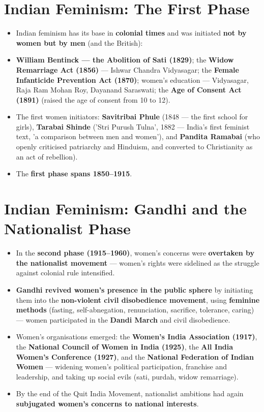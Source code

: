 \section{Indian Feminism: The First Phase}

\begin{KeyConcept}
\begin{itemize}
\item Indian feminism has its base in \textbf{colonial times} and was initiated \textbf{not by women but by men} (and the British):
\item \textbf{William Bentinck --- the Abolition of Sati (1829)}; the \textbf{Widow Remarriage Act (1856)} --- Ishwar Chandra Vidyasagar; the \textbf{Female Infanticide Prevention Act (1870)}; women's education --- Vidyasagar, Raja Ram Mohan Roy, Dayanand Saraswati; the \textbf{Age of Consent Act (1891)} (raised the age of consent from 10 to 12).
\item The first women initiators: \textbf{Savitribai Phule} (1848 --- the first school for girls), \textbf{Tarabai Shinde} ('Stri Purush Tulna', 1882 --- India's first feminist text, 'a comparison between men and women'), and \textbf{Pandita Ramabai} (who openly criticised patriarchy and Hinduism, and converted to Christianity as an act of rebellion).
\item The \textbf{first phase spans 1850--1915}.
\end{itemize}
\end{KeyConcept}

\section{Indian Feminism: Gandhi and the Nationalist Phase}

\begin{KeyConcept}
\begin{itemize}
\item In the \textbf{second phase (1915--1960)}, women's concerns were \textbf{overtaken by the nationalist movement} --- women's rights were sidelined as the struggle against colonial rule intensified.
\item \textbf{Gandhi revived women's presence in the public sphere} by initiating them into the \textbf{non-violent civil disobedience movement}, using \textbf{feminine methods} (fasting, self-abnegation, renunciation, sacrifice, tolerance, caring) --- women participated in the \textbf{Dandi March} and civil disobedience.
\item Women's organisations emerged: the \textbf{Women's India Association (1917)}, the \textbf{National Council of Women in India (1925)}, the \textbf{All India Women's Conference (1927)}, and the \textbf{National Federation of Indian Women} --- widening women's political participation, franchise and leadership, and taking up social evils (sati, purdah, widow remarriage).
\item By the end of the Quit India Movement, nationalist ambitions had again \textbf{subjugated women's concerns to national interests}.
\end{itemize}
\end{KeyConcept}

